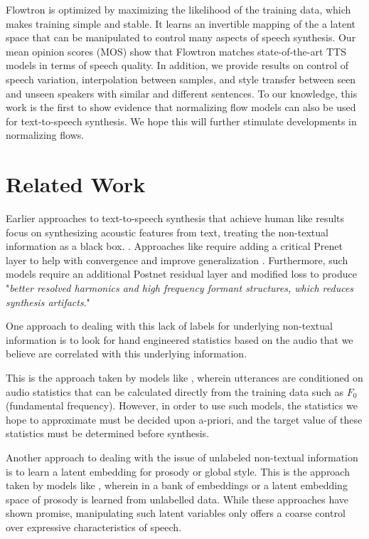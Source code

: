 \documentclass{article}
\begin{document}
Flowtron is optimized by maximizing the likelihood of the training data, which makes training simple and stable. It learns an invertible mapping of the a latent space that can be manipulated to control many aspects of speech synthesis. Our mean opinion scores (MOS) show that Flowtron matches state-of-the-art TTS models in terms of speech quality. In addition, we provide results on control of speech variation, interpolation between samples, and style transfer between seen and unseen speakers with similar and different sentences. To our knowledge, this work is the first to show evidence that normalizing flow models can also be used for text-to-speech synthesis. We hope this will further stimulate developments in normalizing flows. \section{Related Work}\label{sec:related_work}
Earlier approaches to text-to-speech synthesis that achieve human like results focus on synthesizing acoustic features from text, treating the non-textual information as a black box. \cite{shen2017natural,arik2017deep,arik2017deep2,ping2017deep}. Approaches like \cite{wang2017tacotron,shen2017natural} require adding a critical Prenet layer to help with convergence and improve generalization \cite{wang2017tacotron}. Furthermore, such models require an additional Postnet residual layer and modified loss to produce "\textit{better resolved harmonics and high frequency formant structures, which reduces synthesis artifacts}."

One approach to dealing with this lack of labels for underlying non-textual information is to look for hand engineered statistics based on the audio that we believe are correlated with this underlying information.

This is the approach taken by models like \cite{Nishimura2016SVS,lee2019adversarially}, wherein utterances are conditioned on audio statistics that can be calculated directly from the training data such as $F_0$ (fundamental frequency). However, in order to use such models, the statistics we hope to approximate must be decided upon a-priori, and the target value of these statistics must be determined before synthesis.

Another approach to dealing with the issue of unlabeled non-textual information is to learn a latent embedding for prosody or global style. This is the approach taken by models like \cite{skerry2018towards,wang2018style}, wherein in a bank of embeddings or a latent embedding space of prosody is learned from unlabelled data. While these approaches have shown promise, manipulating such latent variables only offers a coarse control over expressive characteristics of speech. 
\end{document}
